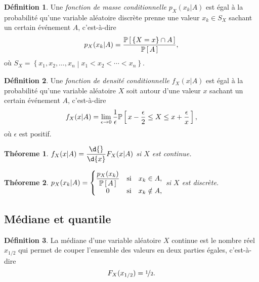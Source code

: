 \documentclass[11pt]{article}
\makeatletter
\renewcommand\P[1]{%
	\ensuremath{%
		\mathbb{P}\left[\,#1\,\right]%
	}%
}%
\newtheorem{theoreme}{Théoreme}[section]
\theoremstyle{remark}
\theoremstyle{definition}
\newtheorem*{@definition}{Définition}
\newenvironment{definition}{%
	\begin{@definition}%
}{%
	\end{@definition}%
	\setcounter{property}{0}%
}
\makeatother
\begin{document}
\begin{definition}
	Une \textit{fonction de masse conditionnelle} $p_X(x_k|A)$ est égal à la
	probabilité qu'une variable aléatoire discrète prenne une valeur $x_k\in
	S_X$ sachant un certain événement $A$, c'est-à-dire
	\begin{equation*}
		p_X(x_k|A)=\frac{\P{\left\{X=x\right\}\cap A}}{\P{A}},
	\end{equation*}
	où $S_X=\left\{x_1,x_2,\dots,x_n\middle\rvert x_1<x_2<\cdots<x_n\right\}$.
\end{definition}

\begin{definition}
	Une \textit{fonction de densité conditionnelle} $f_X(x|A)$ est égal à la
	probabilité qu'une variable aléatoire $X$ soit autour d'une valeur $x$
	sachant un certain événement $A$, c'est-à-dire
	\begin{equation*}
		f_X(x|A)
		=\lim_{\epsilon\rightarrow 0}\frac{1}{\epsilon}\P{
			x-\frac{\epsilon}{2}\leq X\leq x+\frac{\epsilon}{x}},
	\end{equation*}
	où $\epsilon$ est positif.
\end{definition}

\begin{theoreme}
	$f_X(x|A)=\dfrac{\d{}}{\d{x}}F_X(x|A)$ si $X$ est continue.
\end{theoreme}

\begin{theoreme}
	$p_X(x_k|A)=
	\left\{
		\begin{matrix}
			\dfrac{p_X(x_k)}{\P{A}} & \text{si} & x_k\in A,\\
			0                       & \text{si} & x_k\notin A,\\
		\end{matrix}
	\right.$
	si $X$ est discrète.
\end{theoreme}

\subsection{Médiane et quantile}
\begin{definition}
	La médiane d'une variable aléatoire $X$ continue est le nombre réel
	$x_{1/2}$ qui permet de couper l'ensemble des valeurs en deux parties
	égales, c'est-à-dire
	\begin{equation*}
		F_X(x_{1/2})=\nicefrac{1}{2}.
	\end{equation*}
\end{definition}
\end{document}
